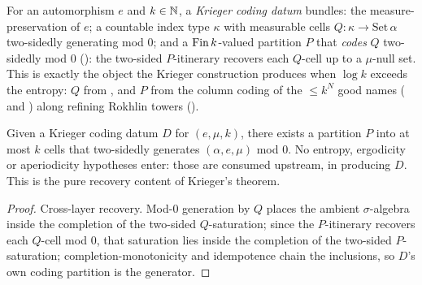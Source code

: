 \begin{definition}\label{KriegerCodingData}
  \leanok
  For an automorphism \(e\) and \(k \in \mathbb{N}\), a \emph{Krieger coding datum} bundles: the
  measure-preservation of \(e\); a countable index type \(\kappa\) with measurable cells
  \(Q : \kappa \to \mathrm{Set}\,\alpha\) two-sidedly generating mod \(0\); and a
  \(\operatorname{Fin} k\)-valued partition \(P\) that \emph{codes} \(Q\) two-sidedly mod \(0\)
  (): the two-sided \(P\)-itinerary recovers each
  \(Q\)-cell up to a \(\mu\)-null set. This is exactly the object the Krieger construction
  produces when \(\log k\) exceeds the entropy: \(Q\) from
  , and \(P\) from the column coding of the
  \(\le k^{N}\) good names ( and
  ) along refining Rokhlin towers ().
\end{definition}

\begin{theorem}\label{krieger_finite_generator_of_coding}
  \leanok
  Given a Krieger coding datum \(D\) for \((e, \mu, k)\), there exists a partition
  \(P\) into at most \(k\) cells that two-sidedly generates \((\alpha, e, \mu)\) mod \(0\). No
  entropy, ergodicity or aperiodicity hypotheses enter: those are consumed upstream, in producing
  \(D\). This is the pure recovery content of Krieger's theorem.
\end{theorem}
\begin{proof}\leanok
  Cross-layer recovery. Mod-\(0\) generation by \(Q\) places the ambient \(\sigma\)-algebra inside
  the completion of the two-sided \(Q\)-saturation; since the \(P\)-itinerary recovers each
  \(Q\)-cell mod \(0\), that saturation lies inside the completion of the two-sided
  \(P\)-saturation; completion-monotonicity and idempotence chain the inclusions, so \(D\)'s own
  coding partition is the generator.
\end{proof}

